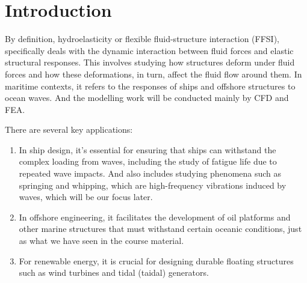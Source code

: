 \documentclass[12pt]{article} %
\begin{document}
\section{Introduction}
By definition, hydroelasticity or flexible fluid-structure interaction (FFSI), specifically deals with the dynamic interaction 
between fluid forces and elastic structural responses. This involves studying how structures deform under fluid forces and how these deformations, in turn, affect the fluid flow around them.
In maritime contexts, it refers to the responses of ships and offshore structures to ocean waves. And the modelling work will be conducted mainly by CFD and FEA.

There are several key applications:
\begin{enumerate}
    \item In ship design, it's essential for ensuring that ships can withstand the complex loading from waves, including the study of fatigue life due to repeated wave impacts.
    And also includes studying phenomena such as springing and whipping, which are high-frequency vibrations induced by waves, which will be our focus later.
    
    \item In offshore engineering, it facilitates the development of oil platforms and other marine structures that must withstand certain oceanic conditions, just as what we have seen in the course material.
    
    \item For renewable energy, it is crucial for designing durable floating structures such as wind turbines and tidal (taidal) generators.
\end{enumerate}

\newpage
\end{document}
